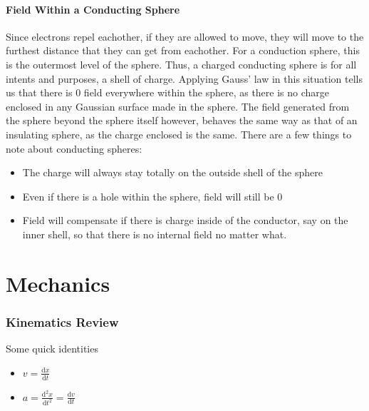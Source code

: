 \documentclass[a4paper,12pt]{article}
\begin{document}
				\subsection{Field Within a Conducting Sphere}
						Since electrons repel eachother, if they are allowed to move, they will move to the furthest distance that they can get from eachother. For a conduction sphere, this is the outermost level of the sphere. Thus, a charged conducting sphere is for all intents and purposes, a shell of charge. Applying Gauss' law in this situation tells us that there is 0 field everywhere within the sphere, as there is no charge enclosed in any Gaussian surface made in the sphere. The field generated from the sphere beyond the sphere itself however, behaves the same way as that of an insulating sphere, as the charge enclosed is the same. 
						There are a few things to note about conducting spheres:
						\begin{itemize}
								\item The charge will always stay totally on the outside shell of the sphere
								\item Even if there is a hole within the sphere, field will still be 0
								\item Field will compensate if there is charge inside of the conductor, say on the inner shell, so that there is no internal field no matter what. 
						\end{itemize}
				\setcounter{subsubsection}{0}
\setcounter{section}{0}
\setcounter{subsection}{0}
\setcounter{subsubsection}{0}
\newpage

\part{Mechanics}
		\section{Kinematics Review}
		Some quick identities
		\begin{itemize}
				\item $v = \frac{\mathrm{d}x}{\mathrm{d}t}$
				\item $a = \frac{\mathrm{d}^{2}x}{\mathrm{d}t^{2}} = \frac{\mathrm{d}v}{\mathrm{d}t}$
		\end{itemize}
\end{document}
